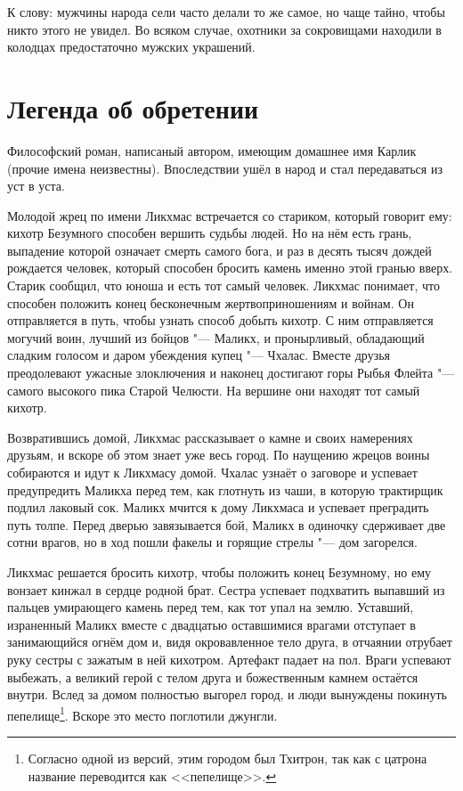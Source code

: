 К слову: мужчины народа сели часто делали то же самое, но чаще тайно, чтобы никто этого не увидел.
Во всяком случае, охотники за сокровищами находили в колодцах предостаточно мужских украшений.

\section{Легенда об обретении}

Философский роман, написаный автором, имеющим домашнее имя Карлик (прочие имена неизвестны).
Впоследствии ушёл в народ и стал передаваться из уст в уста.

Молодой жрец по имени Ликхмас встречается со стариком, который говорит ему: кихотр Безумного способен вершить судьбы людей.
Но на нём есть грань, выпадение которой означает смерть самого бога, и раз в десять тысяч дождей рождается человек, который способен бросить камень именно этой гранью вверх.
Старик сообщил, что юноша и есть тот самый человек.
Ликхмас понимает, что способен положить конец бесконечным жертвоприношениям и войнам.
Он отправляется в путь, чтобы узнать способ добыть кихотр.
С ним отправляется могучий воин, лучший из бойцов "--- Маликх, и пронырливый, обладающий сладким голосом и даром убеждения купец "--- Чхалас.
Вместе друзья преодолевают ужасные злоключения и наконец достигают горы Рыбья Флейта "--- самого высокого пика Старой Челюсти.
На вершине они находят тот самый кихотр.

Возвратившись домой, Ликхмас рассказывает о камне и своих намерениях друзьям, и вскоре об этом знает уже весь город.
По наущению жрецов воины собираются и идут к Ликхмасу домой.
Чхалас узнаёт о заговоре и успевает предупредить Маликха перед тем, как глотнуть из чаши, в которую трактирщик подлил лаковый сок.
Маликх мчится к дому Ликхмаса и успевает преградить путь толпе.
Перед дверью завязывается бой, Маликх в одиночку сдерживает две сотни врагов, но в ход пошли факелы и горящие стрелы "--- дом загорелся.

Ликхмас решается бросить кихотр, чтобы положить конец Безумному, но ему вонзает кинжал в сердце родной брат.
Сестра успевает подхватить выпавший из пальцев умирающего камень перед тем, как тот упал на землю.
Уставший, израненный Маликх вместе с двадцатью оставшимися врагами отступает в занимающийся огнём дом и, видя окровавленное тело друга, в отчаянии отрубает руку сестры с зажатым в ней кихотром.
Артефакт падает на пол.
Враги успевают выбежать, а великий герой с телом друга и божественным камнем остаётся внутри.
Вслед за домом полностью выгорел город, и люди вынуждены покинуть пепелище\footnote
{Согласно одной из версий, этим городом был Тхитрон, так как с цатрона название переводится как <<пепелище>>. \authornote}.
Вскоре это место поглотили джунгли.

